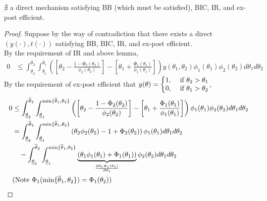 \documentclass[11pt]{elegantbook_2}
\begin{document}
\begin{theorem}
    $\nexists$ a direct mechanism satisfying BB (which must be satisfied), BIC, IR, and ex-post efficient.
\end{theorem}
\begin{proof}
    Suppose by the way of contradiction that there exists a direct $(y(\cdot),t(\cdot))$ satisfying BB, BIC, IR, and ex-post efficient.\\
    By the requirement of IR and above lemma,
    \begin{equation}
        \begin{aligned}
            0&\leq \int_{\underline{\theta}_2}^{\overline{\theta}_2}\int_{\underline{\theta}_1}^{\overline{\theta}_1} \left(\left[\theta_2-\frac{1-\Phi_2(\theta_2)}{\phi_2(\theta_2)}\right]-\left[\theta_1+\frac{\Phi_1(\theta_1)}{\phi_1(\theta_1)}\right]\right)y(\theta_1,\theta_2)\phi_1(\theta_1)\phi_2(\theta_2)d\theta_1d\theta_2
        \end{aligned}
        \nonumber
    \end{equation}
    By the requirement of ex-post efficient that $y(\theta)=\left\{\begin{matrix}
        1,& \textnormal{ if }\theta_2>\theta_1\\
        0,& \textnormal{ if }\theta_1>\theta_2
    \end{matrix}\right.$,
    \begin{equation}
        \begin{aligned}
            0&\leq \int_{\underline{\theta}_2}^{\overline{\theta}_2}\int_{\underline{\theta}_1}^{\min\{\overline{\theta}_1,\theta_2\}} \left(\left[\theta_2-\frac{1-\Phi_2(\theta_2)}{\phi_2(\theta_2)}\right]-\left[\theta_1+\frac{\Phi_1(\theta_1)}{\phi_1(\theta_1)}\right]\right)\phi_1(\theta_1)\phi_2(\theta_2)d\theta_1d\theta_2\\
            &=\int_{\underline{\theta}_2}^{\overline{\theta}_2}\int_{\underline{\theta}_1}^{\min\{\overline{\theta}_1,\theta_2\}} \left(\theta_2\phi_2(\theta_2)-1+\Phi_2(\theta_2)\right)\phi_1(\theta_1)d\theta_1d\theta_2\\
            &\quad -\int_{\underline{\theta}_2}^{\overline{\theta}_2}\int_{\underline{\theta}_1}^{\min\{\overline{\theta}_1,\theta_2\}}\underbrace{\left(\theta_1\phi_1(\theta_1)+\Phi_1(\theta_1)\right)}_{\frac{\partial \theta_1\Phi_1(\theta_1)}{\partial \theta_1}}\phi_2(\theta_2)d\theta_1d\theta_2\\
            &\textnormal{(Note $\Phi_1(\min\{\overline{\theta}_1,\theta_2\})=\Phi_1(\theta_2)$)}\\

\end{aligned}
\end{equation}
\end{proof}
\end{document}
